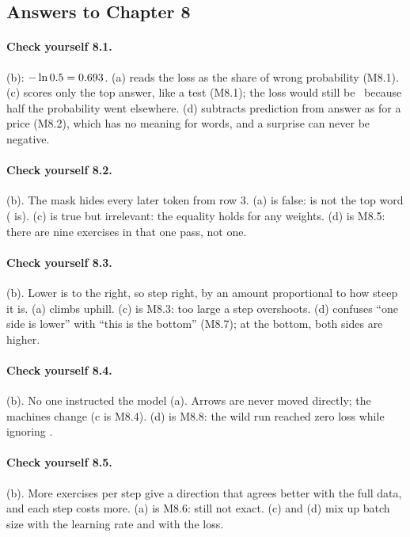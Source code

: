 \subsection*{Answers to Chapter 8}

\paragraph{Check yourself 8.1.} (b): $-\ln 0.5 = 0.693$. (a) reads the loss as the share of wrong
probability (M8.1). (c) scores only the top answer, like a test (M8.1); the loss would still be
\nEightSurpHalf\ because half the probability went elsewhere. (d) subtracts prediction from answer as for a
price (M8.2), which has no meaning for words, and a surprise can never be negative.

\paragraph{Check yourself 8.2.} (b). The mask hides every later token from row 3. (a) is false: 
is not the top word (\tok{\nEightTopWord} is). (c) is true but irrelevant: the equality holds for any weights.
(d) is M8.5: there are nine exercises in that one pass, not one.

\paragraph{Check yourself 8.3.} (b). Lower is to the right, so step right, by an amount proportional to how
steep it is. (a) climbs uphill. (c) is M8.3: too large a step overshoots. (d) confuses ``one side is lower''
with ``this is the bottom'' (M8.7); at the bottom, both sides are higher.

\paragraph{Check yourself 8.4.} (b). No one instructed the model (a). Arrows are never moved directly; the
machines change (c is M8.4). (d) is M8.8: the wild run reached zero loss while ignoring .

\paragraph{Check yourself 8.5.} (b). More exercises per step give a direction that agrees better with the
full data, and each step costs more. (a) is M8.6: still not exact. (c) and (d) mix up batch size with the
learning rate and with the loss.

